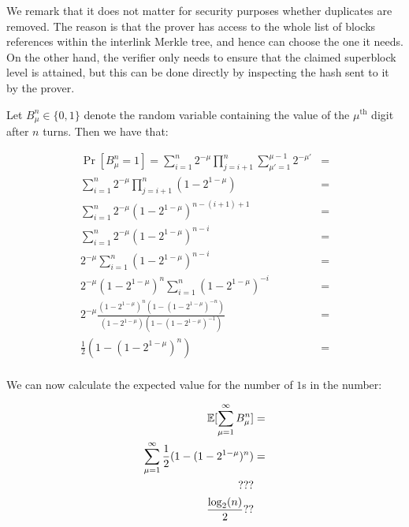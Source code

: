 We remark that it does not matter for security purposes whether duplicates are
removed. The reason is that the prover has access to the whole list of blocks
references within the interlink Merkle tree, and hence can choose the one it
needs. On the other hand, the verifier only needs to ensure that the claimed
superblock level is attained, but this can be done directly by inspecting the
hash sent to it by the prover.


Let $B^n_\mu \in \{0, 1\}$ denote the random variable containing the value of
the $\mu^{\text{th}}$ digit after $n$ turns. Then we have that:

\begin{align*}
\Pr[B^n_\mu = 1] =
\sum_{i = 1}^n 2^{-\mu} \prod_{j = i + 1}^n \sum_{\mu' = 1}^{\mu - 1} 2^{-\mu'} &=\\
\sum_{i = 1}^n 2^{-\mu} \prod_{j = i + 1}^n (1 - 2^{1 - \mu}) &=\\
\sum_{i = 1}^n 2^{-\mu} (1 - 2^{1 -\mu})^{n - (i + 1) + 1} &=\\
\sum_{i = 1}^n 2^{-\mu} (1 - 2^{1 -\mu})^{n - i} &=\\
2^{-\mu} \sum_{i = 1}^n (1 - 2^{1 -\mu})^{n - i} &=\\
2^{-\mu} (1 - 2^{1 - \mu})^n \sum_{i = 1}^n (1 - 2^{1 -\mu})^{-i} &=\\
2^{-\mu} \frac{(1 - 2^{1 - \mu})^n (1 - (1 - 2^{1-\mu})^{-n})}{(1 - 2^{1 - \mu})(1 - (1 - 2^{1 - \mu})^{-1})} &=\\
\frac{1}{2} (1 - (1 - 2^{1 - \mu})^n) &=\\
\end{align*}


We can now calculate the expected value for the number of $1$s in the
number:

\begin{align*}
  \operatorname{\mathbb{E}}[\sum_{\mu = 1}^\infty B^n_\mu] &= \\
  \sum_{\mu = 1}^\infty \frac{1}{2} (1 - (1 - 2^{1 - \mu})^n) &=\\
  ???\\
  \frac{\log_2(n)}{2}??
\end{align*}

